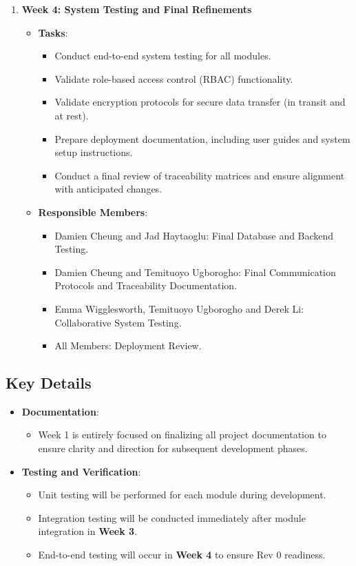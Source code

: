 \documentclass[12pt, titlepage]{article}
\begin{document}
\begin{enumerate}
  \item \textbf{Week 4: System Testing and Final Refinements}
        \begin{itemize}
          \item \textbf{Tasks}:
                \begin{itemize}
                  \item Conduct end-to-end system testing for all modules.
                  \item Validate role-based access control (RBAC) functionality.
                  \item Validate encryption protocols for secure data transfer (in transit and at rest).
                  \item Prepare deployment documentation, including user guides and system setup instructions.
                  \item Conduct a final review of traceability matrices and ensure alignment with anticipated changes.
                \end{itemize}
          \item \textbf{Responsible Members}:
                \begin{itemize}
                  \item Damien Cheung and Jad Haytaoglu: Final Database and Backend Testing.
                  \item Damien Cheung and Temituoyo Ugborogho: Final Communication Protocols and Traceability Documentation.
                  \item Emma Wigglesworth, Temituoyo Ugborogho and Derek Li: Collaborative System Testing.
                  \item All Members: Deployment Review.
                \end{itemize}
        \end{itemize}
\end{enumerate}

\subsection*{Key Details}
\begin{itemize}
  \item \textbf{Documentation}:
        \begin{itemize}
          \item Week 1 is entirely focused on finalizing all project documentation to ensure clarity and direction for subsequent development phases.
        \end{itemize}
  \item \textbf{Testing and Verification}:
        \begin{itemize}
          \item Unit testing will be performed for each module during development.
          \item Integration testing will be conducted immediately after module integration in \textbf{Week 3}.
          \item End-to-end testing will occur in \textbf{Week 4} to ensure Rev 0 readiness.
        \end{itemize}
\end{itemize}
\end{document}
